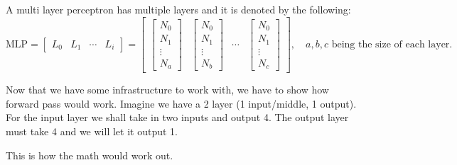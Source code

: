 \begin{definition}[MLP]
    A multi layer perceptron has multiple layers and it is denoted by the following:
    \begin{equation}
        \text{MLP} = 
        \begin{bmatrix}
            L_0 & L_1 & \cdots & L_i
        \end{bmatrix}
        =
        \begin{bmatrix}
           \begin{bmatrix}
                N_0 \\
                N_1 \\
                \vdots \\
                N_a    
          \end{bmatrix} 
          &
          \begin{bmatrix}
                N_0 \\
                N_1 \\
                \vdots \\
                N_b    
          \end{bmatrix}
          &
          \cdots
          & 
          \begin{bmatrix}
                N_0 \\
                N_1 \\
                \vdots \\
                N_c    
          \end{bmatrix}
        \end{bmatrix}, \quad a,b,c \text{ being the size of each layer.}
    \end{equation}
\end{definition}

Now that we have some infrastructure to work with, we have to show how 
forward pass would work. Imagine we have a 2 layer (1 input/middle, 1 output). 
For the input layer we shall take in two inputs and output 4. The output layer must take 
4 and we will let it output 1.
    
This is how the math would work out.

